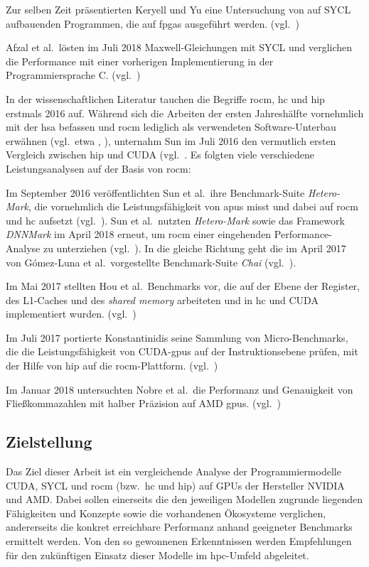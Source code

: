 Zur selben Zeit präsentierten Keryell und Yu eine Untersuchung von
auf SYCL aufbauenden Programmen, die auf \gls{fpga}s ausgeführt werden.
(vgl.~\cite{keryell2018})

Afzal et al.\ lösten im Juli 2018 Maxwell-Gleichungen mit SYCL und verglichen
die Performance mit einer vorherigen Implementierung in der Programmiersprache
C.
(vgl.~\cite{afzal2018})

In der wissenschaftlichen Literatur tauchen die Begriffe \gls{rocm}, \gls{hc}
und \gls{hip} erstmals 2016 auf. Während sich die Arbeiten der ersten
Jahreshälfte vornehmlich mit der \gls{hsa} befassen und \gls{rocm} lediglich als
verwendeten Software-Unterbau erwähnen (vgl.\ etwa \cite{li2016},
\cite{larsson2016}), unternahm Sun im Juli 2016 den vermutlich ersten Vergleich
zwischen \gls{hip} und CUDA (vgl.~\cite{sun2016}. Es folgten viele verschiedene
Leistungsanalysen auf der Basis von \gls{rocm}:

Im September 2016 veröffentlichten Sun et al.\ ihre Benchmark-Suite
\textit{Hetero-Mark}, die vornehmlich die Leistungsfähigkeit von \gls{apu}s
misst und dabei auf \gls{rocm} und \gls{hc} aufsetzt (vgl.~\cite{sunyifan2016}).
Sun et al.\ nutzten \textit{Hetero-Mark} sowie das Framework \textit{DNNMark} im
April 2018 erneut, um \gls{rocm} einer eingehenden Performance-Analyse zu
unterziehen (vgl.~\cite{sun2018}). In die gleiche Richtung geht die im April
2017 von Gómez-Luna et al.\ vorgestellte Benchmark-Suite \textit{Chai}
(vgl.~\cite{gomezluna2017}). 

Im Mai 2017 stellten Hou et al.\ Benchmarks vor, die auf der Ebene der Register,
des L1-Caches und des \textit{shared memory} arbeiteten und in \gls{hc} und
CUDA implementiert wurden. (vgl.~\cite{hou2017})

Im Juli 2017 portierte Konstantinidis seine Sammlung von Micro-Benchmarks, die
die Leistungsfähigkeit von CUDA-\gls{gpu}s auf der Instruktionsebene prüfen,
mit der Hilfe von \gls{hip} auf die \gls{rocm}-Plattform.
(vgl.~\cite{konstantinidis2017})

Im Januar 2018 untersuchten Nobre et al.\ die Performanz und Genauigkeit von
Fließkommazahlen mit halber Präzision auf AMD \gls{gpu}s.
(vgl.~\cite{nobre2018})

\subsection{Zielstellung}
\label{einleitung:zielstellung}

Das Ziel dieser Arbeit ist ein vergleichende Analyse der Programmiermodelle
CUDA, SYCL und \gls{rocm} (bzw.\ \gls{hc} und \gls{hip}) auf GPUs der Hersteller
NVIDIA und AMD. Dabei sollen einerseits die den jeweiligen Modellen zugrunde
liegenden Fähigkeiten und Konzepte sowie die vorhandenen Ökosysteme verglichen,
andererseits die konkret erreichbare Performanz anhand geeigneter Benchmarks
ermittelt werden. Von den so gewonnenen Erkenntnissen werden Empfehlungen für 
den zukünftigen Einsatz dieser Modelle im \gls{hpc}-Umfeld abgeleitet.
